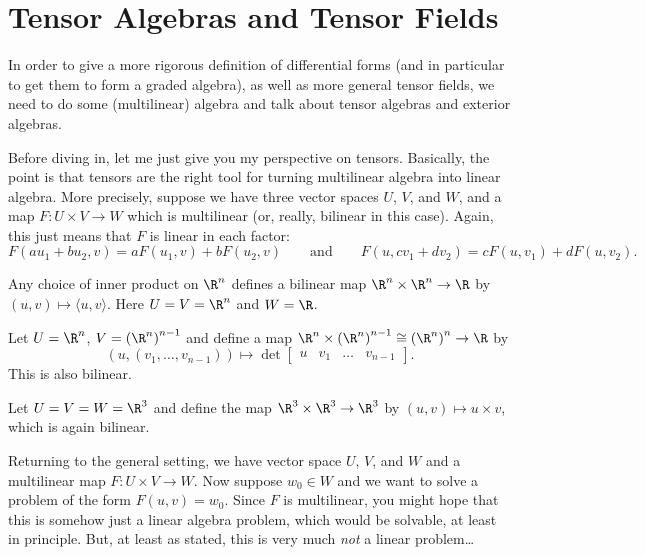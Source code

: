 
\section{Tensor Algebras and Tensor Fields}

In order to give a more rigorous definition of differential forms (and in particular to get them to form a graded algebra), as well as more general tensor fields, we need to do some (multilinear) algebra and talk about tensor algebras and exterior algebras.

Before diving in, let me just give you my perspective on tensors. Basically, the point is that tensors are the right tool for turning multilinear algebra into linear algebra. More precisely, suppose we have three vector spaces $U$, $V$, and $W$, and a map $F: U \times V \to W$ which is multilinear (or, really, bilinear in this case). Again, this just means that $F$ is linear in each factor:
\[
	F(au_1 + bu_2, v) = aF(u_1,v) + b F(u_2,v) \qquad \text{and} \qquad F(u,cv_1 + dv_2) = cF(u,v_1) + dF(u,v_2).
\]

\begin{example}
	Any choice of inner product on $\R^n$ defines a bilinear map $\R^n \times \R^n \to \R$ by $(u,v) \mapsto \langle u, v \rangle$. Here $U = V = \R^n$ and $W = \R$.
\end{example}

\begin{example}
	Let $U = \R^n$, $V = \left(\R^n\right)^{n-1}$ and define a map $\R^n \times \left(\R^n\right)^{n-1} \cong \left(\R^n\right)^n \to \R$ by
	\[
		(u, (v_1, \dots , v_{n-1})) \mapsto \det \begin{bmatrix} u & v_1 & \dots & v_{n-1} \end{bmatrix}.
	\]
	This is also bilinear.
\end{example}

\begin{example}\label{ex:cross product as bilinear map}
	Let $U = V = W = \R^3$ and define the map $\R^3 \times \R^3 \to \R^3$ by $(u,v) \mapsto u \times v$, which is again bilinear.
\end{example}

Returning to the general setting, we have vector space $U$, $V$, and $W$ and a multilinear map $F: U \times V \to W$. Now suppose $w_0 \in W$ and we want to solve a problem of the form $F(u,v) = w_0$. Since $F$ is multilinear, you might hope that this is somehow just a linear algebra problem, which would be solvable, at least in principle. But, at least as stated, this is very much \emph{not} a linear problem…

